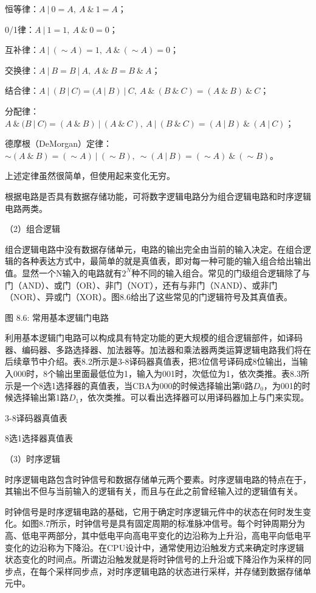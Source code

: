 \documentclass[]{ctexbook}
\begin{document}
恒等律：\(A \ |\  0 = A,\ A \ \&\  1 = A\)；

0/1律：\(A \ |\ 1 = 1,\ A \ \&\ 0 = 0\)；

互补律：\(A \ |\ ( \sim A) = 1,\ A \ \&\ (\sim A) = 0\)；

交换律：\(A \ |\ B = B \ |\ A,\ A \ \&\ B = B \ \&\ A\)；

结合律：\(A \ |\ (B \ |\ C) = (A \ |\ B) \ |\ C,\ A \ \&\ (B \ \&\ C) = (A \ \&\ B) \ \&\ C\)；

分配律：\(A \ \&\ (B \ |\ C) = (A \ \&\ B) \ |\ (A \ \&\ C),\ A \ |\ (B \ \&\ C) = (A \ |\ B) \ \&\ (A \ |\ C)\)；

德摩根（DeMorgan）定律：\(\sim (A \ \&\ B) = (\sim A) \ |\ (\sim B),\ \sim (A \ |\ B) = (\sim A) \ \&\ (\sim B)\)。

上述定律虽然很简单，但使用起来变化无穷。

根据电路是否具有数据存储功能，可将数字逻辑电路分为组合逻辑电路和时序逻辑电路两类。

（2）组合逻辑

组合逻辑电路中没有数据存储单元，电路的输出完全由当前的输入决定。在组合逻辑的各种表达方式中，最简单的就是真值表，即对每一种可能的输入组合给出输出值。显然一个N输入的电路就有\(2^{N}\)种不同的输入组合。常见的门级组合逻辑除了与门（AND）、或门（OR）、非门（NOT），还有与非门（NAND）、或非门（NOR）、异或门（XOR）。图8.6给出了这些常见的门逻辑符号及其真值表。

图 8.6: 常用基本逻辑门电路

利用基本逻辑门电路可以构成具有特定功能的更大规模的组合逻辑部件，如译码器、编码器、多路选择器、加法器等。加法器和乘法器两类运算逻辑电路我们将在后续章节中介绍。表8.2所示是3-8译码器真值表，把3位信号译码成8位输出，当输入000时，8个输出里面最低位为1，输入为001时，次低位为1，依次类推。表8.3所示是一个8选1选择器的真值表，当CBA为000的时候选择输出第0路\(D_{0}\)，为001的时候选择输出第1路\(D_{1}\)，依次类推。可以看出选择器可以用译码器加上与门来实现。

\label{tab:3-8decoder}3-8译码器真值表

\label{tab:8-1selector}8选1选择器真值表

（3）时序逻辑

时序逻辑电路包含时钟信号和数据存储单元两个要素。时序逻辑电路的特点在于，其输出不但与当前输入的逻辑有关，而且与在此之前曾经输入过的逻辑值有关。

时钟信号是时序逻辑电路的基础，它用于确定时序逻辑元件中的状态在何时发生变化。如图8.7所示，时钟信号是具有固定周期的标准脉冲信号。每个时钟周期分为高、低电平两部分，其中低电平向高电平变化的边沿称为上升沿，高电平向低电平变化的边沿称为下降沿。在CPU设计中，通常使用边沿触发方式来确定时序逻辑状态变化的时间点。所谓边沿触发就是将时钟信号的上升沿或下降沿作为采样的同步点，在每个采样同步点，对时序逻辑电路的状态进行采样，并存储到数据存储单元中。
\end{document}
